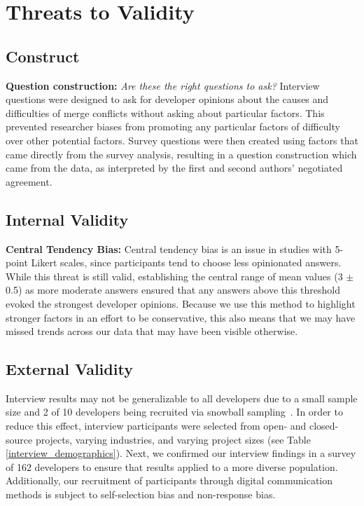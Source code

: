 \section{Threats to Validity}\label{threats}
\subsection{Construct}
\textbf{Question construction:}
\textit{Are these the right questions to ask?} Interview questions were designed to ask for developer opinions about the causes and difficulties of merge conflicts without asking about particular factors. This prevented researcher biases from promoting any particular factors of difficulty over other potential factors. 
Survey questions were then created using factors that came directly from the survey analysis, resulting in a question construction which came from the data, as interpreted by the first and second authors' negotiated agreement.
\subsection{Internal Validity}
\textbf{Central Tendency Bias:}
Central tendency bias \cite{guilford1954psychometric} is an issue in studies with 5-point Likert scales, since participants tend to choose less opinionated answers. While this threat is still valid, establishing the central range of mean values (3 $\pm$ 0.5) as more moderate answers ensured that any answers above this threshold evoked the strongest developer opinions. Because we use this method to highlight stronger factors in an effort to be conservative, this also means that we may have missed trends across our data that may have been visible otherwise.

\subsection{External Validity}
Interview results may not be generalizable to all developers due to a small sample size and 2 of 10 developers being recruited via snowball sampling~\cite{goodman1961snowball}. In order to reduce this effect, interview participants were selected from open- and closed-source projects, varying industries, and varying project sizes (see Table \ref{interview_demographics}). Next, we confirmed our interview findings in a survey of 162 developers to ensure that results applied to a more diverse population. Additionally, our recruitment of participants through digital communication methods is subject to self-selection bias and non-response bias.

